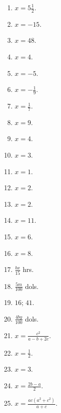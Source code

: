 \documentclass{book}
\begin{document}
\begin{enumerate}
\item $x = 5\frac{1}{2}$.

\item $x = -15$.

\item $x = 48$.

\item $x = 4$.

\item $x = -5$.

\item $x = -\frac{1}{9}$.

\item $x = \frac{1}{7}$.

\item $x = 9$.

\item $x = 4$.

\item $x = 3$.

\item $x = 1$.

\item $x = 2$.

\item $x = 2$.

\item $x =11$.

\item $x = 6$.

\item $x = 8$.

\item $\displaystyle \frac{bx}{15}$ hrs.

\item $\displaystyle \frac{5m}{100}$ dols.

\item $16$; $41$.

\item $\displaystyle \frac{4by}{100}$ dols.

\item $\displaystyle x = \frac{c^2}{ a - b + 2c }$.

\item $x = \frac{1}{2}$.

\item $x = 3$.

\item $\displaystyle x = \frac{2b - a}{2}$.

\item $\displaystyle x = \frac{ac(a^2 + c^2)}{a + c}$.


\end{enumerate}
\end{document}
